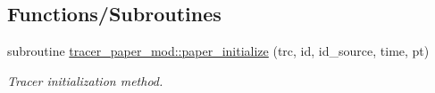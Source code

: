\subsection*{Functions/\+Subroutines}
\begin{DoxyCompactItemize}
\item 
subroutine \hyperlink{namespacetracer__paper__mod_a4e3b16f967d34cd206499188e17ac4f2}{tracer\+\_\+paper\+\_\+mod\+::paper\+\_\+initialize} (trc, id, id\+\_\+source, time, pt)
\begin{DoxyCompactList}\small\item\em Tracer initialization method. \end{DoxyCompactList}\end{DoxyCompactItemize}
